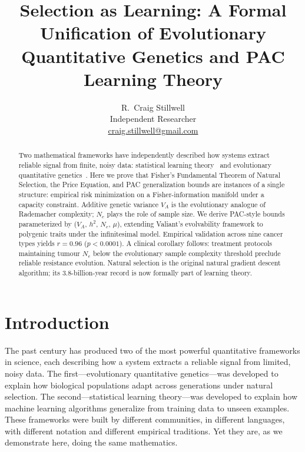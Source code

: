 \documentclass[12pt]{article}
\title{Selection as Learning: A Formal Unification of Evolutionary\\
Quantitative Genetics and PAC Learning Theory}
\author{R.\ Craig Stillwell\\[0.4em]
\small Independent Researcher\\
\small \href{mailto:craig.stillwell@gmail.com}{craig.stillwell@gmail.com}}
\date{}
\theoremstyle{remark}
\begin{document}
\maketitle

\begin{abstract}
Two mathematical frameworks have independently described how systems extract reliable signal from finite, noisy data: statistical learning theory~\cite{vapnik1971,valiant1984} and evolutionary quantitative genetics~\cite{fisher1918,price1970,lande1979}. Here we prove that Fisher's Fundamental Theorem of Natural Selection, the Price Equation, and PAC generalization bounds are instances of a single structure: empirical risk minimization on a Fisher-information manifold under a capacity constraint. Additive genetic variance $V_A$ is the evolutionary analogue of Rademacher complexity; $N_e$ plays the role of sample size. We derive PAC-style bounds parameterized by ($V_A$, $h^2$, $N_e$, $\mu$), extending Valiant's evolvability framework to polygenic traits under the infinitesimal model. Empirical validation across nine cancer types yields $r = 0.96$ ($p < 0.0001$). A clinical corollary follows: treatment protocols maintaining tumour $N_e$ below the evolutionary sample complexity threshold preclude reliable resistance evolution. Natural selection is the original natural gradient descent algorithm; its 3.8-billion-year record is now formally part of learning theory.
\end{abstract}

\section{Introduction}

The past century has produced two of the most powerful quantitative frameworks in science, each describing how a system extracts a reliable signal from limited, noisy data. The first---evolutionary quantitative genetics---was developed to explain how biological populations adapt across generations under natural selection. The second---statistical learning theory---was developed to explain how machine learning algorithms generalize from training data to unseen examples. These frameworks were built by different communities, in different languages, with different notation and different empirical traditions. Yet they are, as we demonstrate here, doing the same mathematics.
\end{document}
